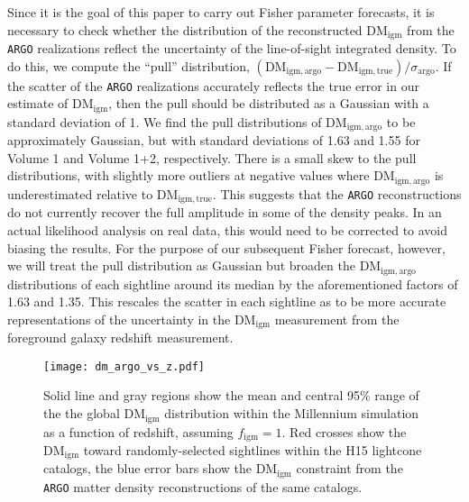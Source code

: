 \documentclass[twocolumn]{aastex63}
\newcommand{\dmigm}{\ensuremath{\mathrm{DM}_\mathrm{igm}}}
\newcommand{\figm}{\ensuremath{f_\mathrm{igm}}}
\newcommand{\argo}{\texttt{ARGO}}
\begin{document}
\begin{CJK*}{UTF8}{gbsn}
Since it is the goal of this paper to carry out Fisher parameter forecasts, it is necessary to check whether the distribution of the reconstructed \dmigm{} from
the \argo{} realizations reflect the uncertainty of the line-of-sight integrated density. To do this, we compute the {``pull''} distribution, $(\mathrm{DM_{igm,argo} }- \mathrm{DM_{igm,true}})/\sigma_\mathrm{argo}$.
If the scatter of the \argo{} realizations accurately reflects the true error in our estimate of \dmigm{}, 
then the pull should be distributed as a Gaussian with a standard deviation of 1. 
We find the pull distributions of $\mathrm{DM_{igm,argo} }$ to be approximately Gaussian, but with standard deviations of 1.63 and 1.55 for Volume 1 and Volume 1+2, respectively. 
{There is a small skew to the pull distributions, with slightly more outliers at negative values where $\mathrm{DM_{igm,argo} }$ is underestimated 
relative to $\mathrm{DM_{igm,true}}$. This suggests that the \argo{} reconstructions do not currently recover the full amplitude in some of the density peaks. In an actual likelihood analysis on real data, this would need to be corrected to avoid biasing the results. 
For the purpose of our subsequent Fisher forecast, however, we will treat the pull distribution as Gaussian} but broaden the $\mathrm{DM_{igm,argo} }$ distributions of each sightline around its median by the aforementioned
factors of 1.63 and 1.35. This rescales the scatter in each sightline as to be more accurate representations of the uncertainty in the \dmigm{} measurement from the 
foreground galaxy redshift measurement.

\begin{figure*}\centering
\texttt{[image: dm\_argo\_vs\_z.pdf]}
\caption{\label{fig:dm_vs_z}  Solid line and gray regions show the mean and central 95\% range of the the global \dmigm{} distribution within the Millennium 
simulation as a function of redshift, assuming $\figm=1$. Red crosses show the \dmigm{} toward randomly-selected sightlines within the H15 lightcone catalogs, 
the blue error bars show the \dmigm{} constraint from the \argo{} matter density reconstructions of the same catalogs. 
}
\end{figure*}


\end{CJK*}
\end{document}
